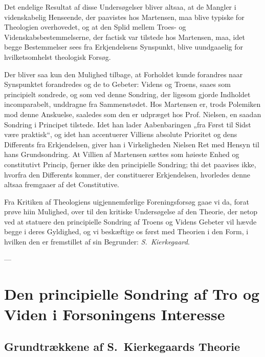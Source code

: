 \documentclass[12pt,a4paper]{book}
\newcommand{\opage}[1]{\marginnote{\footnotesize\textit{[#1]}}}
\begin{document}
Det endelige Resultat af disse Undersøgelser bliver altsaa, at de Mangler i videnskabelig
Henseende, der paavistes hos Martensen, maa blive typiske for Theologien overhovedet, og at
den Splid mellem Troes- og Videnskabsbestemmelserne, der factisk var tilstede hos
Martensen, maa, idet begge Bestemmelser sees fra Erkjendelsens Synspunkt, blive uundgaaelig
for hvilketsomhelst theologisk Forsøg.

Der bliver saa kun den Mulighed tilbage, at Forholdet kunde forandres naar Synspunktet
forandredes og de to Gebeter: Videns og Troens, saaes som principielt sondrede, og som ved
denne Sondring, der ligesom gjorde Indholdet incomparabelt, unddragne fra Sammenstødet. Hos
Martensen er, trods Polemiken mod denne Anskuelse, saaledes som den er udpræget hos Prof.
Nielsen, en saadan Sondring i Principet tilstede. Idet han lader Aabenbaringen „fra Først
til Sidst være praktisk“, og idet han accentuerer Villiens absolute Prioritet og dens
Differents fra Erkjendelsen, giver han i Virkeligheden Nielsen Ret med Hensyn til hans
Grundsondring. At Villien af Martensen sættes som høieste Enhed og constitutivt Princip,
fjerner ikke den principielle Sondring; thi det paavises ikke, hvorfra den Differents
kommer, der constituerer Erkjendelsen, hvorledes denne altsaa fremgaaer af det Constitutive.

\opage{118}Fra Kritiken af Theologiens uigjennemførlige Foreningsforsøg gaae vi da, forat prøve hiin
Mulighed, over til den kritiske Undersøgelse af den Theorie, der netop ved at statuere den
principielle Sondring af Troens og Videns Gebeter vil hævde begge i deres Gyldighed, og vi
beskæftige os først med Theorien i den Form, i hvilken den er fremstillet af sin Begrunder: \emph{S.\ Kierkegaard}.

\begin{center}---\end{center}


\chapter{Den principielle Sondring af Tro og Viden i Forsoningens
  Interesse}
\label{ch:sondring}

\section{Grundtrækkene af S.\ Kierkegaards Theorie}
\label{sec:kierkegaard}
\end{document}

